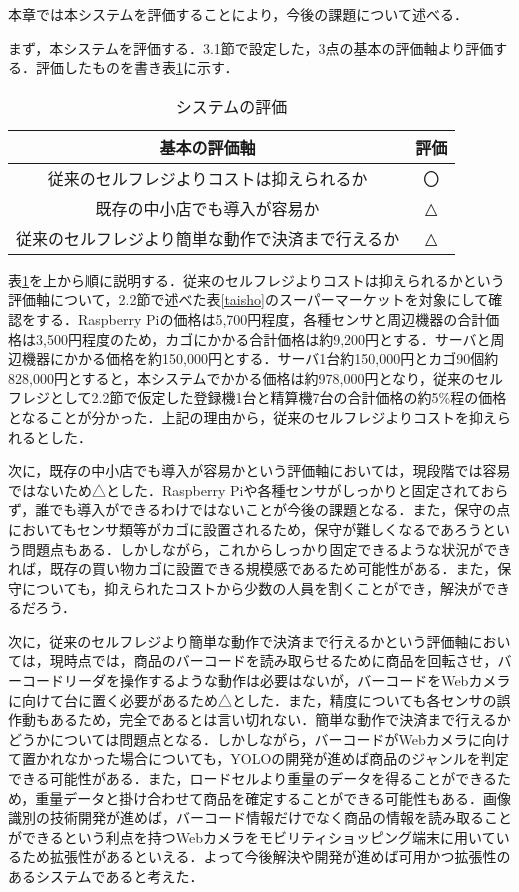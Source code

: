 
本章では本システムを評価することにより，今後の課題について述べる．

まず，本システムを評価する．3.1節で設定した，3点の基本の評価軸より評価する．評価したものを書き表\ref{hyouka}に示す．

\begin{table}[htb]
\begin{center}
\caption{システムの評価}
\begin{tabular}{|c|c|} \hline
基本の評価軸 & 評価 \\ \hline \hline
従来のセルフレジよりコストは抑えられるか & 〇 \\
既存の中小店でも導入が容易か & △ \\
従来のセルフレジより簡単な動作で決済まで行えるか & △\\ \hline
\end{tabular}
\label{hyouka}
\end{center}
\end{table}

表\ref{hyouka}を上から順に説明する．従来のセルフレジよりコストは抑えられるかという評価軸について，2.2節で述べた表\ref{taisho}のスーパーマーケットを対象にして確認をする．Raspberry Piの価格は5,700円程度，各種センサと周辺機器の合計価格は3,500円程度のため，カゴにかかる合計価格は約9,200円とする．サーバと周辺機器にかかる価格を約150,000円とする．サーバ1台約150,000円とカゴ90個約828,000円とすると，本システムでかかる価格は約978,000円となり，従来のセルフレジとして2.2節で仮定した登録機1台と精算機7台の合計価格の約5\%程の価格となることが分かった．上記の理由から，従来のセルフレジよりコストを抑えられるとした．

次に，既存の中小店でも導入が容易かという評価軸においては，現段階では容易ではないため△とした．Raspberry Piや各種センサがしっかりと固定されておらず，誰でも導入ができるわけではないことが今後の課題となる．また，保守の点においてもセンサ類等がカゴに設置されるため，保守が難しくなるであろうという問題点もある．しかしながら，これからしっかり固定できるような状況ができれば，既存の買い物カゴに設置できる規模感であるため可能性がある．また，保守についても，抑えられたコストから少数の人員を割くことができ，解決ができるだろう．

次に，従来のセルフレジより簡単な動作で決済まで行えるかという評価軸においては，現時点では，商品のバーコードを読み取らせるために商品を回転させ，バーコードリーダを操作するような動作は必要はないが，バーコードをWebカメラに向けて台に置く必要があるため△とした．また，精度についても各センサの誤作動もあるため，完全であるとは言い切れない．簡単な動作で決済まで行えるかどうかについては問題点となる．しかしながら，バーコードがWebカメラに向けて置かれなかった場合についても，YOLOの開発が進めば商品のジャンルを判定できる可能性がある．また，ロードセルより重量のデータを得ることができるため，重量データと掛け合わせて商品を確定することができる可能性もある．画像識別の技術開発が進めば，バーコード情報だけでなく商品の情報を読み取ることができるという利点を持つWebカメラをモビリティショッピング端末に用いているため拡張性があるといえる．よって今後解決や開発が進めば可用かつ拡張性のあるシステムであると考えた．


